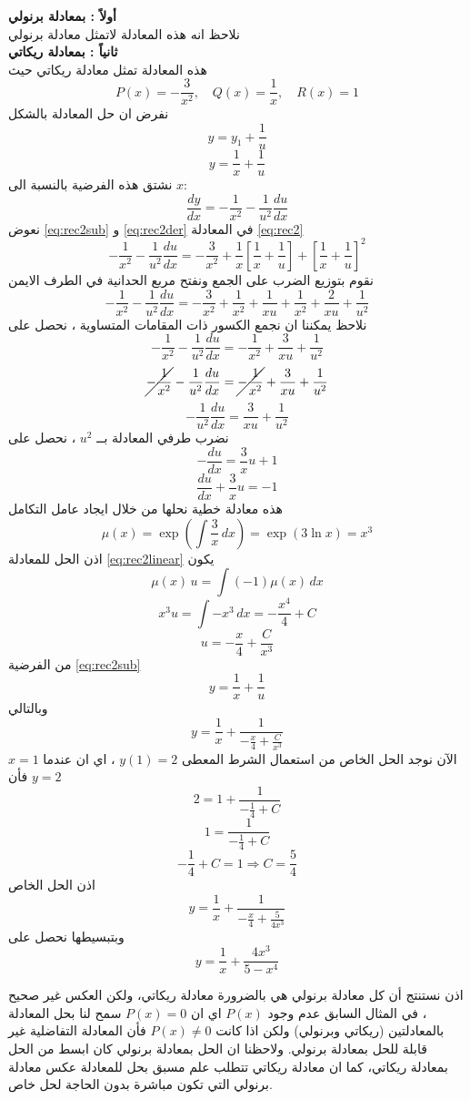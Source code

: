 \begin{solution}
	\textbf{أولاً : بمعادلة برنولي}\\
	نلاحظ انه هذه المعادلة لاتمثل معادلة برنولي\\[10pt]
	\textbf{ثانياً : بمعادلة ريكاتي}\\
	هذه المعادلة تمثل معادلة ريكاتي حيث
	\[
	P(x) = -\frac{3}{x^2}, \quad Q(x) = \frac{1}{x} , \quad R(x) = 1 
	\]
	نفرض ان حل المعادلة بالشكل
	\[
	y = y_1 + \frac{1}{u}
	\]
	\begin{equation}
		\label{eq:rec2sub}
		y = \frac{1}{x} + \frac{1}{u}
	\end{equation}
	نشتق هذه الفرضية بالنسبة الى $x$:
	\begin{equation}
		\label{eq:rec2der}
		\frac{dy}{dx} = -\frac{1}{x^2} - \frac{1}{u^2}\frac{du}{dx}
	\end{equation}
	نعوض 
	\eqref{eq:rec2sub} و \eqref{eq:rec2der} في المعادلة \eqref{eq:rec2}
	\[
	-\frac{1}{x^2} - \frac{1}{u^2}\frac{du}{dx}
	=
	-\frac{3}{x^2} + \frac{1}{x}\left[\frac{1}{x} + \frac{1}{u}\right]
	+ \left[\frac{1}{x} + \frac{1}{u}\right]^2
	\]
	نقوم بتوزيع الضرب على الجمع ونفتح مربع الحدانية في الطرف الايمن
	\[
	-\frac{1}{x^2} - \frac{1}{u^2}\frac{du}{dx}
	=
	-\frac{3}{x^2} + \frac{1}{x^2} + \frac{1}{xu}
	+ \frac{1}{x^2} + \frac{2}{xu} + \frac{1}{u^2}
	\]
	نلاحظ يمكننا ان نجمع الكسور ذات المقامات المتساوية ، نحصل على 
	\[
	-\frac{1}{x^2} - \frac{1}{u^2}\frac{du}{dx}
	=
	-\frac{1}{x^2} + \frac{3}{xu} + \frac{1}{u^2}
	\]
	\[
	\cancel{-\frac{1}{x^2}} - \frac{1}{u^2}\frac{du}{dx}
	=
	\cancel{-\frac{1}{x^2}} + \frac{3}{xu} + \frac{1}{u^2}
	\]
	\[
	-\frac{1}{u^2}\frac{du}{dx} = \frac{3}{xu} + \frac{1}{u^2}
	\]
	نضرب طرفي المعادلة بــ $u^2$ ، نحصل على 
	\[
	-\frac{du}{dx} = \frac{3}{x}u + 1
	\]
	\begin{equation}
		\label{eq:rec2linear}
		\frac{du}{dx} + \frac{3}{x}u = -1
	\end{equation}
	هذه معادلة خطية نحلها من خلال ايجاد عامل التكامل
	\[
	\mu(x) = \exp\left(\int \frac{3}{x}\,dx\right) = \exp(3\ln x)=x^3
	\]
	اذن الحل للمعادلة \eqref{eq:rec2linear} يكون 
	\[
	\mu(x)\,u = \int (-1)\mu(x)\,dx
	\]
	\[
	x^3u = \int -x^3\,dx = -\frac{x^4}{4}+C
	\]
	\[
	u = -\frac{x}{4}+\frac{C}{x^3}
	\]
	من الفرضية \eqref{eq:rec2sub}
	\[
	y = \frac{1}{x} + \frac{1}{u}
	\]
	وبالتالي
	\[
	y = \frac{1}{x} + \frac{1}{-\frac{x}{4}+\frac{C}{x^3}}
	\]
	الآن نوجد الحل الخاص من استعمال الشرط المعطى 
	$y(1)=2$ ، اي ان عندما $x=1$ فأن $y=2$
	\[
	2 = 1 + \frac{1}{-\frac{1}{4}+C}
	\]
	\[
	1 = \frac{1}{-\frac{1}{4}+C}
	\]
	\[
	-\frac{1}{4}+C = 1 \Rightarrow C=\frac{5}{4}
	\]
	اذن الحل الخاص 
	\[
	y = \frac{1}{x} + \frac{1}{-\frac{x}{4}+\frac{5}{4x^3}}
	\]
	وبتبسيطها نحصل على
	\[
	y = \frac{1}{x} + \frac{4x^3}{5-x^4}
	\]
\end{solution}
\vskip2cm
\noindent
اذن نستنتج أن كل معادلة برنولي هي بالضرورة معادلة ريكاتي، ولكن العكس غير صحيح ، في المثال السابق عدم وجود  $P(x)$ اي ان $P(x)=0 $ 
سمح لنا بحل المعادلة بالمعادلتين (ريكاتي وبرنولي) ولكن اذا كانت $P(x)\neq 0 $ فأن المعادلة التفاضلية غير قابلة للحل بمعادلة برنولي. ولاحظنا ان الحل بمعادلة برنولي كان ابسط من الحل بمعادلة ريكاتي، كما ان معادلة ريكاتي تتطلب علم مسبق بحل للمعادلة عكس معادلة برنولي التي تكون مباشرة بدون الحاجة لحل خاص.
